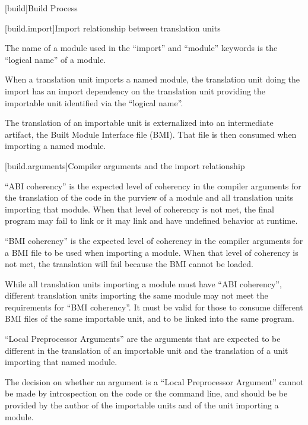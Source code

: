 
[build]{Build Process}

%

[build.import]{Import relationship between translation units}

\pnum The name of a module used in the ``import'' and ``module''
keywords is the ``logical name'' of a module.

\pnum When a translation unit imports a named module, the translation
unit doing the import has an import dependency on the translation unit
providing the importable unit identified via the ``logical name''.

\pnum The translation of an importable unit is externalized into an
intermediate artifact, the Built Module Interface file (BMI). That
file is then consumed when importing a named module.

[build.arguments]{Compiler arguments and the import relationship}

\pnum ``ABI coherency'' is the expected level of coherency in the
compiler arguments for the translation of the code in the purview of a
module and all translation units importing that module. When that
level of coherency is not met, the final program may fail to link or
it may link and have undefined behavior at runtime.

\pnum ``BMI coherency'' is the expected level of coherency in the
compiler arguments for a BMI file to be used when importing a
module. When that level of coherency is not met, the translation will
fail because the BMI cannot be loaded.

\pnum While all translation units importing a module must have ``ABI
coherency'', different translation units importing the same module may
not meet the requirements for ``BMI coherency''. It must be valid for
those to consume different BMI files of the same importable unit, and
to be linked into the same program.

\pnum ``Local Preprocessor Arguments'' are the arguments that are
expected to be different in the translation of an importable unit and
the translation of a unit importing that named module.

\pnum The decision on whether an argument is a ``Local Preprocessor
Argument'' cannot be made by introspection on the code or the command
line, and should be be provided by the author of the importable units
and of the unit importing a module.

